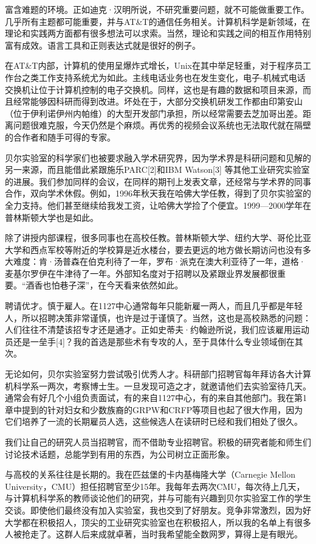\documentclass[a4paper,12pt,UTF8,twoside]{ctexbook}
\begin{document}
富含难题的环境。正如迪克·汉明所说，不研究重要问题，就不可能做重要工作。几乎所有主题都可能重要，并与AT\&T的通信任务相关。计算机科学是新领域，在理论和实践两方面都有很多想法可以求索。当然，理论和实践之间的相互作用特别富有成效。语言工具和正则表达式就是很好的例子。

在AT\&T内部，计算机的使用呈爆炸式增长，Unix在其中举足轻重，对于程序员工作台之类工作支持系统尤为如此。主线电话业务也在发生变化，电子-机械式电话交换机让位于计算机控制的电子交换机。同样，这也是有趣的数据和项目来源，而且经常能够因科研而得到改进。坏处在于，大部分交换机研发工作都由印第安山（位于伊利诺伊州内帕维）的大型开发部门承担，所以经常需要去芝加哥出差。距离问题很难克服，今天仍然是个麻烦。再优秀的视频会议系统也无法取代就在隔壁的合作者和随手可得的专家。

贝尔实验室的科学家们也被要求融入学术研究界，因为学术界是科研问题和见解的另一来源，而且能借此紧跟施乐PARC[2]和IBM Watson[3] 等其他工业研究实验室的进展。我们参加同样的会议，在同样的期刊上发表文章，还经常与学术界的同事合作，双向学术休假。例如，1996年秋天我在哈佛大学任教，得到了贝尔实验室的全力支持。他们甚至继续给我发工资，让哈佛大学捡了个便宜。1999—2000学年在普林斯顿大学也是如此。

除了讲授内部课程，很多同事也在高校任教。普林斯顿大学、纽约大学、哥伦比亚大学和西点军校等附近的学校算是近水楼台，要去更远的地方做长期访问也没有多大难度：肯·汤普森在伯克利待了一年，罗布·派克在澳大利亚待了一年，道格·麦基尔罗伊在牛津待了一年。外部知名度对于招聘以及紧跟业界发展都很重要。“酒香也怕巷子深”，在今天看来依然如此。

聘请优才。慎于雇人。在1127中心通常每年只能新雇一两人，而且几乎都是年轻人，所以招聘决策非常谨慎，也许是过于谨慎了。当然，这也是高校熟悉的问题：人们往往不清楚该招专才还是通才。正如史蒂夫·约翰逊所说，我们应该雇用运动员还是一垒手[4]？我的首选是那些术有专攻的人，至于具体什么专业领域倒在其次。

无论如何，贝尔实验室努力尝试吸引优秀人才。科研部门招聘官每年拜访各大计算机科学系一两次，考察博士生。一旦发现可造之才，就邀请他们去实验室待几天。通常会有好几个小组负责面试，有的来自1127中心，有的来自其他部门。我在第1章中提到的针对妇女和少数族裔的GRPW和CRFP等项目也起了很大作用，因为它们培养了一流的长期雇员人选，这些候选人在读研时已经和我们相处了很久。

我们让自己的研究人员当招聘官，而不借助专业招聘官。积极的研究者能和师生们讨论技术话题，总能学到有用的东西，为公司树立正面形象。

与高校的关系往往是长期的。我在匹兹堡的卡内基梅隆大学（Carnegie Mellon University，CMU）担任招聘官至少15年。我每年去两次CMU，每次待上几天，与计算机科学系的教师谈论他们的研究，并与可能有兴趣到贝尔实验室工作的学生交谈。即使他们最终没有加入实验室，我也交到了好朋友。竞争非常激烈，因为好大学都在积极招人，顶尖的工业研究实验室也在积极招人，所以我的名单上有很多人被抢走了。这群人后来成就卓著，当时我希望能全数网罗，算得上是有眼光。
\end{document}
